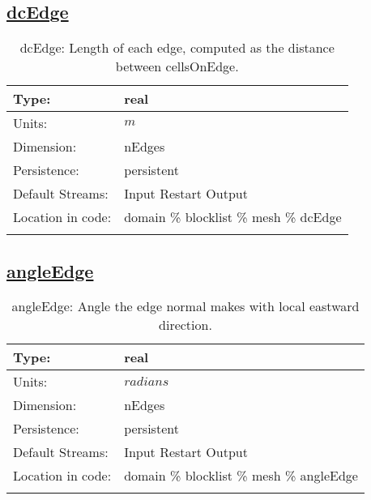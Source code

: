 \subsection[dcEdge]{\hyperref[sec:var_tab_mesh]{dcEdge}}
\label{subsec:var_sec_mesh_dcEdge}
\begin{center}
\begin{longtable}{| p{2.0in} | p{4.0in} |}
        \hline 
        Type: & real \\
        \hline 
        Units: & $m$ \\
        \hline 
        Dimension: & nEdges \\
        \hline 
        Persistence: & persistent \\
        \hline 
		 Default Streams: & Input Restart Output  \\
        \hline 
		 Location in code: & domain \% blocklist \% mesh \% dcEdge \\
		 \hline 
    \caption{dcEdge: Length of each edge, computed as the distance between cellsOnEdge.}
\end{longtable}
\end{center}
\subsection[angleEdge]{\hyperref[sec:var_tab_mesh]{angleEdge}}
\label{subsec:var_sec_mesh_angleEdge}
\begin{center}
\begin{longtable}{| p{2.0in} | p{4.0in} |}
        \hline 
        Type: & real \\
        \hline 
        Units: & $radians$ \\
        \hline 
        Dimension: & nEdges \\
        \hline 
        Persistence: & persistent \\
        \hline 
		 Default Streams: & Input Restart Output  \\
        \hline 
		 Location in code: & domain \% blocklist \% mesh \% angleEdge \\
		 \hline 
    \caption{angleEdge: Angle the edge normal makes with local eastward direction.}
\end{longtable}
\end{center}
